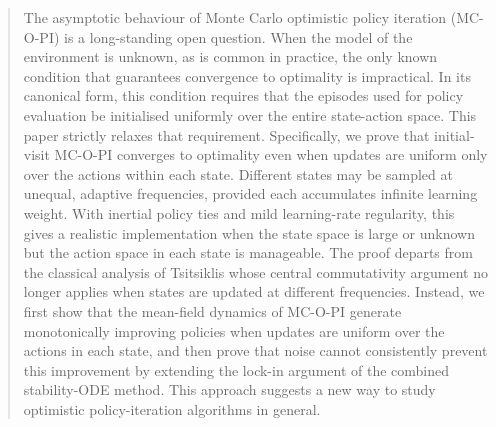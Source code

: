 \documentclass[twoside,11pt]{article}
\begin{document}
\begin{abstract}
% 
The asymptotic behaviour of Monte Carlo optimistic policy iteration (MC-O-PI) is a long-standing open question. When the model of the environment is unknown, as is common in practice, the only known condition that guarantees convergence to optimality is impractical. In its canonical form, this condition requires that the episodes used for policy evaluation be initialised uniformly over the entire state-action space. This paper strictly relaxes that requirement. Specifically, we prove that initial-visit MC-O-PI converges to optimality even when updates are uniform only over the actions within each state. Different states may be sampled at unequal, adaptive frequencies, provided each accumulates infinite learning weight. With inertial policy ties and mild learning-rate regularity, this gives a realistic implementation when the state space is large or unknown but the action space in each state is manageable. The proof departs from the classical analysis of Tsitsiklis whose central commutativity argument no longer applies when states are updated at different frequencies. Instead, we first show that the mean-field dynamics of MC-O-PI generate monotonically improving policies when updates are uniform over the actions in each state, and then prove that noise cannot consistently prevent this improvement by extending the lock-in argument of the combined stability-ODE method. This approach suggests a new way to study optimistic policy-iteration algorithms in general.
\end{abstract}
\end{document}
